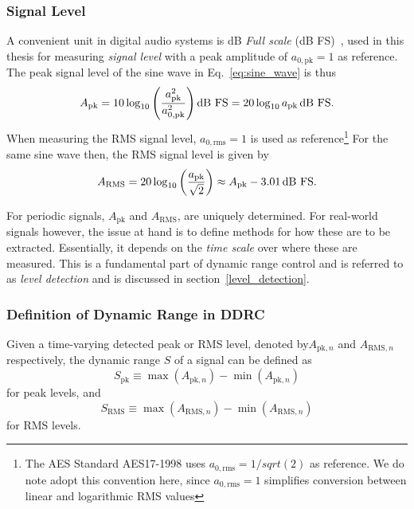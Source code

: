 \documentclass[../main2.tex]{subfiles}
\begin{document}
\subsubsection{Signal Level}
A convenient unit in digital audio systems is dB \emph{Full scale} (dB FS)~\cite{db_fullscale}, used in this thesis for measuring \emph{signal level} with a peak amplitude of $a_{0, \text{pk}} = 1$ as reference. The peak signal level of the sine wave in Eq.~\eqref{eq:sine_wave} is thus
\begin{equation}
A_\text{pk} = 10 \log_{10} \left( \frac{a_\text{pk}^2}{a_{0, \text{pk}}^2} \right) \text{dB FS} = 20 \log_{10} a_\text{pk} \mskip3mu\text{dB FS}.
\end{equation}
When measuring the RMS signal level, $a_{0, \text{rms}} = 1$ is used as reference\footnote{The  AES Standard AES17-1998 uses $a_{0, \text{rms}} = 1/sqrt(2)$ as reference. We do note adopt this convention here, since $a_{0, \text{rms}} = 1$ simplifies conversion between linear and logarithmic RMS values}
For the same sine wave then, the RMS signal level is given by
\begin{equation}
A_\text{RMS} = 20\log_{10} \left( \frac{a_\text{pk}}{\sqrt 2} \right) \approx A_\text{pk}- 3.01 \mskip3mu\text{dB FS}.
\end{equation}

For periodic signals, $A_\text{pk}$ and $A_\text{RMS}$, are uniquely determined. For real-world signals however, the issue at hand is to define methods for how these are to be extracted. Essentially, it depends on the \emph{time scale} over where these are measured. This is a fundamental part of dynamic range control and is referred to as \emph{level detection} and is discussed in section~\ref{level_detection}. 

\subsubsection{Definition of Dynamic Range in DDRC}
Given a time-varying detected peak or RMS level,  denoted by$A_{\text{pk},n}$ and $A_{\text{RMS},n}$ respectively, the dynamic range $S$ of a signal can be defined as
\begin{equation}\label{eq:s_peak}
S_\text{pk} \equiv \max(A_{\text{pk},n}) - \min(A_{\text{pk},n})
\end{equation}
for peak levels, and
\begin{equation}\label{eq:s_RMS}
S_\text{RMS} \equiv \max(A_{\text{RMS},n}) - \min(A_{\text{RMS},n})
\end{equation}
for RMS levels.
\end{document}
